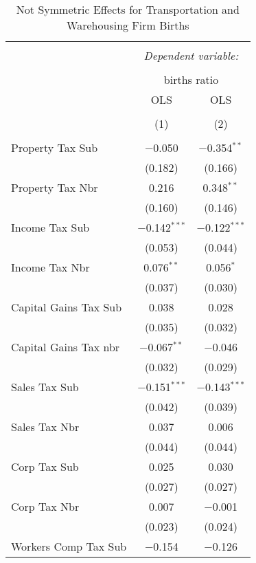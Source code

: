 
\begin{table}[!htbp] \centering 
  \caption{Not Symmetric Effects for  Transportation and Warehousing Firm Births} 
  \label{48-49noequality} 
\footnotesize 
\begin{tabular}{@{\extracolsep{5pt}}lcc} 
\\[-1.8ex]\hline 
\hline \\[-1.8ex] 
 & \multicolumn{2}{c}{\textit{Dependent variable:}} \\ 
\cline{2-3} 
\\[-1.8ex] & \multicolumn{2}{c}{births ratio} \\ 
 & OLS & OLS \\ 
\\[-1.8ex] & (1) & (2)\\ 
\hline \\[-1.8ex] 
 Property Tax Sub & $-$0.050 & $-$0.354$^{**}$ \\ 
  & (0.182) & (0.166) \\ 
  Property Tax Nbr & 0.216 & 0.348$^{**}$ \\ 
  & (0.160) & (0.146) \\ 
  Income Tax Sub & $-$0.142$^{***}$ & $-$0.122$^{***}$ \\ 
  & (0.053) & (0.044) \\ 
  Income Tax Nbr & 0.076$^{**}$ & 0.056$^{*}$ \\ 
  & (0.037) & (0.030) \\ 
  Capital Gains Tax Sub & 0.038 & 0.028 \\ 
  & (0.035) & (0.032) \\ 
  Capital Gains Tax nbr & $-$0.067$^{**}$ & $-$0.046 \\ 
  & (0.032) & (0.029) \\ 
  Sales Tax Sub & $-$0.151$^{***}$ & $-$0.143$^{***}$ \\ 
  & (0.042) & (0.039) \\ 
  Sales Tax Nbr & 0.037 & 0.006 \\ 
  & (0.044) & (0.044) \\ 
  Corp Tax Sub & 0.025 & 0.030 \\ 
  & (0.027) & (0.027) \\ 
  Corp Tax Nbr & 0.007 & $-$0.001 \\ 
  & (0.023) & (0.024) \\ 
  Workers Comp Tax Sub & $-$0.154 & $-$0.126 \\ 

\end{tabular}
\end{table}

